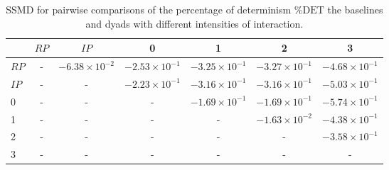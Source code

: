 \begin{table}
\centering
\caption{SSMD for pairwise comparisons of the percentage of determinism $\%\text{DET}$ the baselines and dyads with different intensities of interaction.}
\label{tab:ssmd_det}
\begin{tabular}{lcccccc}
\toprule
 & $RP$ & $IP$ & 0 & 1 & 2 & 3 \\
\midrule
$RP$ & - & $-6.38 \times 10^{-2}$ & $-2.53 \times 10^{-1}$ & $-3.25 \times 10^{-1}$ & $-3.27 \times 10^{-1}$ & $-4.68 \times 10^{-1}$ \\
$IP$ & - & - & $-2.23 \times 10^{-1}$ & $-3.16 \times 10^{-1}$ & $-3.16 \times 10^{-1}$ & $-5.03 \times 10^{-1}$ \\
0 & - & - & - & $-1.69 \times 10^{-1}$ & $-1.69 \times 10^{-1}$ & $-5.74 \times 10^{-1}$ \\
1 & - & - & - & - & $-1.63 \times 10^{-2}$ & $-4.38 \times 10^{-1}$ \\
2 & - & - & - & - & - & $-3.58 \times 10^{-1}$ \\
3 & - & - & - & - & - & - \\
\bottomrule
\end{tabular}
\end{table}
